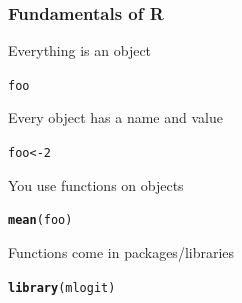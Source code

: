 \documentclass{beamer}\usepackage[]{graphicx}\usepackage[]{color}
\makeatletter
\newcommand{\hlnum}[1]{\textcolor[rgb]{0.686,0.059,0.569}{#1}}%
\newcommand{\hlstd}[1]{\textcolor[rgb]{0.345,0.345,0.345}{#1}}%
\newcommand{\hlkwb}[1]{\textcolor[rgb]{0.69,0.353,0.396}{#1}}%
\newcommand{\hlkwd}[1]{\textcolor[rgb]{0.737,0.353,0.396}{\textbf{#1}}}%
\newenvironment{kframe}{%
 \def\at@end@of@kframe{}%
 \ifinner\ifhmode%
  \def\at@end@of@kframe{\end{minipage}}%
  \begin{minipage}{\columnwidth}%
 \fi\fi%
 \def\FrameCommand##1{\hskip\@totalleftmargin \hskip-\fboxsep
 \colorbox{shadecolor}{##1}\hskip-\fboxsep
     \hskip-\linewidth \hskip-\@totalleftmargin \hskip\columnwidth}%
 \MakeFramed {\advance\hsize-\width
   \@totalleftmargin\z@ \linewidth\hsize
   \@setminipage}}%
 {\par\unskip\endMakeFramed%
 \at@end@of@kframe}
\newenvironment{knitrout}{}{} %
\makeatother
\begin{document}
\begin{frame}[fragile]\frametitle{Fundamentals of R}
    Everything is an object
\begin{knitrout}\footnotesize
{}\color{fgcolor}\begin{kframe}
\begin{alltt}
\hlstd{foo}
\end{alltt}
\end{kframe}
\end{knitrout}
    \vspace{3ex}
    Every object has a name and value
\begin{knitrout}\footnotesize
{}\color{fgcolor}\begin{kframe}
\begin{alltt}
\hlstd{foo} \hlkwb{<-} \hlnum{2}
\end{alltt}
\end{kframe}
\end{knitrout}
    \vspace{3ex}
    You use functions on objects
\begin{knitrout}\footnotesize
{}\color{fgcolor}\begin{kframe}
\begin{alltt}
\hlkwd{mean}\hlstd{(foo)}
\end{alltt}
\end{kframe}
\end{knitrout}
    \vspace{3ex}
    Functions come in packages/libraries
\begin{knitrout}\footnotesize
{}\color{fgcolor}\begin{kframe}
\begin{alltt}
\hlkwd{library}\hlstd{(mlogit)}
\end{alltt}
\end{kframe}
\end{knitrout}
\end{frame}
\end{document}
